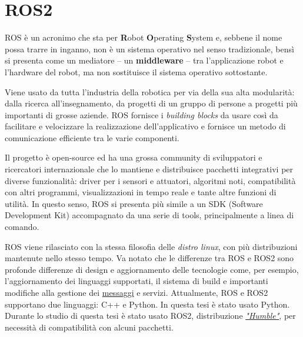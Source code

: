 \section{ROS2}
\label{sec:ros}
ROS è un acronimo che sta per \textbf{R}obot \textbf{O}perating \textbf{S}ystem e,
sebbene il nome possa trarre in inganno, non è un sistema operativo nel senso tradizionale,
bensì si presenta come un mediatore -- un \textbf{middleware} -- tra l'applicazione robot
e l'hardware del robot, ma non sostituisce il sistema operativo sottostante.

Viene usato da tutta l'industria della robotica per via della sua alta modularità:
dalla ricerca all'insegnamento, da progetti di un gruppo di persone a progetti più importanti
di grosse aziende. ROS fornisce i \textit{building blocks} da usare così da facilitare e velocizzare
la realizzazione dell'applicativo e fornisce un metodo di comunicazione efficiente tra le varie componenti.

Il progetto è open-source ed ha una grossa community di sviluppatori e ricercatori internazionale
che lo mantiene e distribuisce pacchetti integrativi per diverse funzionalità: driver per i sensori
e attuatori, algoritmi noti, compatibilità con altri programmi, visualizzazioni in tempo reale
e tante altre funzioni di utilità. In questo senso, ROS si presenta più simile a un SDK 
(Software Development Kit) accompagnato da una serie di tools, principalmente a linea di comando.

ROS viene rilasciato con la stessa filosofia delle \textit{distro linux}, con più distribuzioni
mantenute nello stesso tempo. Va notato che le differenze tra ROS e ROS2 sono profonde differenze di
design e aggiornamento delle tecnologie come, per esempio, l'aggiornamento dei linguaggi supportati,
il sistema di build e importanti modifiche alla gestione dei \hyperref[ros:msgs]{messaggi} e servizi.
Attualmente, ROS e ROS2 supportano due linguaggi: C++ e Python. In questa tesi è stato usato Python.
Durante lo studio di questa tesi è stato usato ROS2, distribuzione
\href{https://docs.ros.org/en/humble/}{\textit{"Humble"}},
per necessità di compatibilità con alcuni pacchetti.

